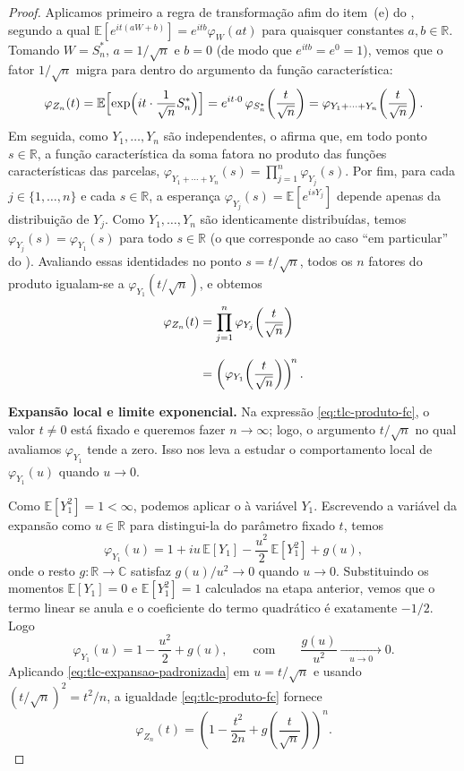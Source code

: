 \documentclass[12pt,portuguese]{article}
\theoremstyle{definition}
\theoremstyle{plainexercise}
\theoremstyle{starredexercise}
\theoremstyle{definition}
\begin{document}
\begin{proof}
Aplicamos primeiro a regra de transformação afim do item~(e) do
, segundo a qual
$\mathbb{E}[e^{it(aW+b)}]=e^{itb}\varphi_W(at)$ para quaisquer constantes
$a,b\in\mathbb{R}$. Tomando $W=S_n^*$, $a=1/\sqrt{n}$ e $b=0$ (de modo que
$e^{itb}=e^0=1$), vemos que o fator $1/\sqrt{n}$ migra para dentro do
argumento da função característica:
\[
\varphi_{Z_n}(t)
=\mathbb{E}\Bigl[\exp\Bigl(it\cdot\frac{1}{\sqrt{n}}S_n^*\Bigr)\Bigr]
=e^{it\cdot 0}\,\varphi_{S_n^*}\!\left(\frac{t}{\sqrt{n}}\right)
=\varphi_{Y_1+\cdots+Y_n}\!\left(\frac{t}{\sqrt{n}}\right).
\]
Em seguida, como $Y_1,\ldots,Y_n$ são independentes, o
 afirma que, em todo ponto
$s\in\mathbb{R}$, a função característica da soma fatora no produto das
funções características das parcelas,
$\varphi_{Y_1+\cdots+Y_n}(s)=\prod_{j=1}^n\varphi_{Y_j}(s)$. Por fim, para
cada $j\in\{1,\ldots,n\}$ e cada $s\in\mathbb{R}$, a esperança
$\varphi_{Y_j}(s)=\mathbb{E}[e^{isY_j}]$ depende apenas da distribuição de
$Y_j$. Como $Y_1,\ldots,Y_n$ são identicamente distribuídas, temos
$\varphi_{Y_j}(s)=\varphi_{Y_1}(s)$ para todo $s\in\mathbb{R}$ (o que
corresponde ao caso ``em particular'' do
). Avaliando essas identidades no ponto
$s=t/\sqrt{n}$, todos os $n$ fatores do produto igualam-se a
$\varphi_{Y_1}(t/\sqrt{n})$, e obtemos
\begin{align}
\varphi_{Z_n}(t)
&=\prod_{j=1}^n\varphi_{Y_j}\!\left(\frac{t}{\sqrt{n}}\right)\notag
\\[0.3cm]
&=\left(\varphi_{Y_1}\!\left(\frac{t}{\sqrt{n}}\right)\right)^{\!n}.
\label{eq:tlc-produto-fc}
\end{align}

\smallskip
\noindent\textbf{Expansão local e limite exponencial.}
Na expressão \eqref{eq:tlc-produto-fc}, o valor $t\neq0$ está fixado e
queremos fazer $n\to\infty$; logo, o argumento $t/\sqrt{n}$ no qual avaliamos
$\varphi_{Y_1}$ tende a zero. Isso nos leva a estudar o comportamento local
de $\varphi_{Y_1}(u)$ quando $u\to0$.

Como $\mathbb{E}[Y_1^2]=1<\infty$, podemos aplicar o
 à variável $Y_1$. Escrevendo a variável da
expansão como $u\in\mathbb{R}$ para distingui-la do parâmetro fixado $t$,
temos
\[
\varphi_{Y_1}(u)
=1+iu\,\mathbb{E}[Y_1]-\frac{u^2}{2}\,\mathbb{E}[Y_1^2]+g(u),
\]
onde o resto $g\colon\mathbb{R}\to\mathbb{C}$ satisfaz $g(u)/u^2\to0$
quando $u\to0$. Substituindo os momentos $\mathbb{E}[Y_1]=0$ e
$\mathbb{E}[Y_1^2]=1$ calculados na etapa anterior,
vemos que o termo linear se anula
e o coeficiente do termo quadrático é exatamente $-1/2$. Logo
\begin{equation}\label{eq:tlc-expansao-padronizada}
\varphi_{Y_1}(u)
=1-\frac{u^2}{2}+g(u),
\qquad\text{com}\qquad
\frac{g(u)}{u^2}\xrightarrow[\quad u\to0\quad]{}0.
\end{equation}
Aplicando \eqref{eq:tlc-expansao-padronizada} em $u=t/\sqrt{n}$ e usando
$(t/\sqrt{n})^2=t^2/n$, a igualdade \eqref{eq:tlc-produto-fc} fornece
\[
\varphi_{Z_n}(t)
=\left(
1-\frac{t^2}{2n}+g\!\left(\frac{t}{\sqrt{n}}\right)
\right)^{\!n}.
\]


\end{proof}
\end{document}
